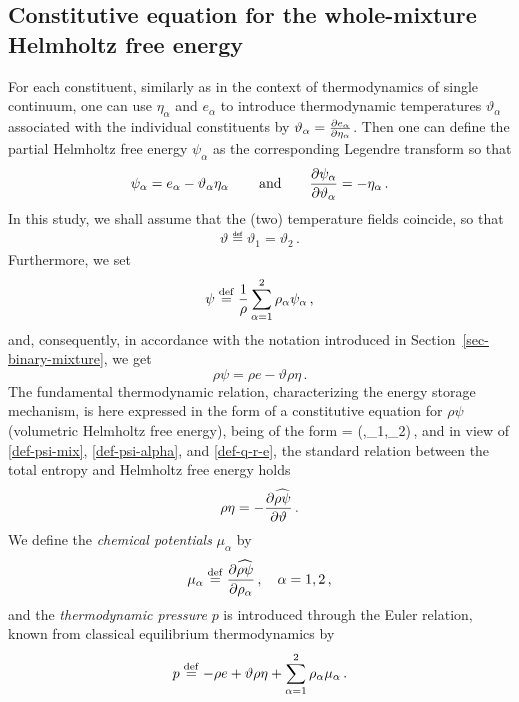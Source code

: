 \documentclass[a4paper]{article}
\begin{document}
\subsection{Constitutive equation for the whole-mixture Helmholtz free energy}
\label{sec-fundamental-relation}
For each constituent, similarly as in the context of thermodynamics of single continuum, one can use $\eta_\alpha$ and $e_\alpha$ to introduce thermodynamic temperatures $\vartheta_\alpha$ associated with the individual constituents by $\vartheta_\alpha=\frac{\partial e_\alpha}{\partial \eta_\alpha}$. Then one can define the partial Helmholtz free energy $\psi_\alpha$ as the corresponding Legendre transform so that
\begin{equation}
\label{def-psi-alpha}
\psi_\alpha =  e_\alpha - \vartheta_\alpha \eta_\alpha\,\qquad\text{and}\qquad \frac{\partial\psi_\alpha}{\partial \vartheta_\alpha} = -\eta_\alpha\,.
\end{equation}
In this study, we shall assume that the (two) temperature fields coincide, so that
\begin{align}
\vartheta\eqdef \vartheta_1 = \vartheta_2\,.
\end{align}
Furthermore, we set
\begin{equation}
\label{def-psi-mix}
\psi\stackrel{\mathrm{def}}{=} \frac{1}{\rho}\sum_{\alpha=1}^2\rho_\alpha\psi_\alpha\,,
\end{equation}
and, consequently, in accordance with the notation introduced in Section~\ref{sec-binary-mixture}, we get
\begin{equation}
\rho\psi = \rho e -  \vartheta \rho\eta\,.
\end{equation}
The fundamental thermodynamic relation, characterizing the energy storage mechanism, is here expressed in the form of a constitutive equation for $\rho\psi$ (volumetric Helmholtz free energy), being of the form
\be
\label{def-psi-compressible}
	\rho\psi = \widehat{\rho\psi}(\vartheta,\rho_1,\rho_2)\,,
\ee 
and in view of \eqref{def-psi-mix}, \eqref{def-psi-alpha}, and \eqref{def-q-r-e}, the standard relation between the total entropy and Helmholtz free energy holds
\begin{align}
\label{eq-aux3}
\rho\eta = -\frac{\partial\widehat{\rho\psi}}{\partial\vartheta}\,.
\end{align}
We define the {\it chemical potentials } $\mu_\alpha$ by
\begin{align}
\label{def-chem-pot}
\mu_\alpha \stackrel{\mathrm{def}}{=}\frac{\partial\widehat{\rho\psi}}{\partial\rho_\alpha}\,,\quad\alpha=1,2\,,
\end{align}
and the {\it thermodynamic pressure} $p$ is introduced through the Euler relation, known from classical equilibrium thermodynamics \cite{callen.hb:thermodynamics} by
\begin{align}
\label{def-pressure}
p \stackrel{\mathrm{def}}{=} -\rho e + \vartheta\rho\eta + \sum_{\alpha=1}^2\rho_\alpha\mu_\alpha\,.
\end{align}
\end{document}
